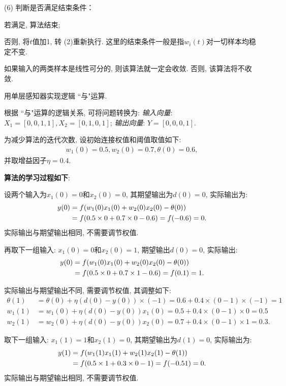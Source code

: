  (6) 判断是否满足结束条件：

 \quad{} 若满足, 算法结束;

 \quad{} 否则, 将$t$值加1, 转 (2)重新执行. 这里的结束条件一般是指$w_i (t)$对一切样本均稳定不变.

 \quad{} 如果输入的两类样本是线性可分的, 则该算法就一定会收敛. 否则, 该算法将不收敛.
\begin{example}
  用单层感知器实现逻辑 ``与"运算.
\end{example}
\begin{result}
根据 ``与"运算的逻辑关系, 可将问题转换为:
\textit{输入向量}: $X_1=[0, 0, 1, 1],X_2=[0, 1, 0, 1]$; \textit{输出向量}: $Y=[0, 0, 0, 1]$.

为减少算法的迭代次数, 设初始连接权值和阈值取值如下:
\begin{align}
    w_1 (0)=0.5,   w_2 (0)=0.7,   \theta (0)=0.6,
\end{align}
并取增益因子$\eta=0.4$.
\end{result}

\textbf{算法的学习过程如下}:

设两个输入为$x_1 (0)=0$和$x_2 (0)=0$, 其期望输出为$d (0)=0$, 实际输出为:
\begin{align*}
y (0)&=f (w_1 (0)x_1 (0)+ w_2 (0)x_2 (0)-\theta (0))\notag\\
     &=f (0.5\times 0+0.7\times 0-0.6)=f (-0.6)=0.
\end{align*}
实际输出与期望输出相同, 不需要调节权值.

再取下一组输入: $x_1 (0)=0$和$x_2 (0)=1$,  期望输出$d (0)=0$, 实际输出:
\begin{align*}
y (0)&=f (w_1 (0) x_1 (0)+ w_2 (0) x_2 (0)-\theta (0))\notag\\
    &=f (0.5\times 0+0.7\times 1-0.6)=f (0.1)=1.
\end{align*}

实际输出与期望输出不同, 需要调节权值, 其调整如下:
\begin{align*}
\theta (1)&=\theta (0)+\eta (d (0)- y (0))\times (-1)=0.6+0.4\times (0-1)\times (-1)=1\\
w_1 (1)&=w_1 (0)+\eta (d (0)- y (0))x_1 (0)=0.5+0.4\times (0-1)\times 0=0.5\\
w_2 (1)&=w_2 (0)+\eta (d (0)- y (0))x_2 (0)=0.7+0.4\times (0-1)\times 1=0.3.
\end{align*}

取下一组输入: $x_1 (1)=1$和$x_2 (1)=0$, 其期望输出为$d (1)=0$, 实际输出为:
\begin{align*}
y (1)&=f (w_1 (1) x_1 (1)+ w_2 (1) x_2 (1)-\theta (1))\notag\\
    &=f (0.5\times 1+0.3\times 0-1)=f (-0.51)=0.
\end{align*}
实际输出与期望输出相同, 不需要调节权值.

